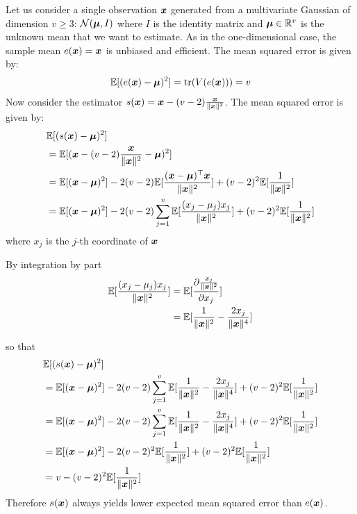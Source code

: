 \begin{example}
  \label{ex:stein}
  Let us consider a single observation $\xb$ generated from a multivariate Gaussian
  of dimension $v \geq 3$: $\Ncal(\mub, I)$ where $I$ is the identity matrix and
  $\mub \in \RR^v$ is the unknown mean that we want to estimate.
  As in the one-dimensional case, the sample mean $e(\xb) =\xb$ is unbiased and efficient.
  The mean squared error is given by:
  \begin{align}
    \EE[(e(\xb) -  \mub )^2] = \tr(V(e(\xb))) = v
  \end{align}
  Now consider the estimator $s(\xb) = \xb - (v-2) \frac{\xb}{\|\xb\|^2}$.
  The mean squared error is given by:
  \begin{align}
    &\EE[(s(\xb) - \mub)^2] \\ &= \EE[(\xb - (v-2) \frac{\xb}{\|\xb\|^2} - \mub)^2] \\
                        &= \EE[(\xb - \mub)^2] -2 (v-2)\EE[\frac{(\xb - \mub)^{\top}\xb}{\|\xb\|^2}] + (v-2)^2 \EE[\frac1{\| \xb \|^2}] \\
                            &= \EE[(\xb - \mub)^2] -2 (v-2) \sum_{j=1}^v \EE[\frac{(x_j - \mu_j)x_j}{\|\xb\|^2}] + (v-2)^2 \EE[\frac1{\| \xb \|^2}]
  \end{align}
  where $x_j$ is the $j$-th coordinate of $\xb$

  By integration by part 
  \begin{align}
    \EE[\frac{(x_j - \mu_j)x_j}{\|\xb\|^2}] &= \EE[\partialfrac{x_j}{\frac{x_j}{\|\xb\|^2}}]  \\
    &= \EE[\frac1{\|\xb\|^2} - \frac{2x_j}{\|\xb\|^4}]
  \end{align}

  so that 
  \begin{align}
    &\EE[(s(\xb) - \mub)^2] \\
    &= \EE[(\xb - \mub)^2] -2 (v-2) \sum_{j=1}^v \EE[\frac1{\|\xb\|^2} - \frac{2x_j}{\|\xb\|^4}] + (v-2)^2 \EE[\frac1{\| \xb \|^2}] \\
    &= \EE[(\xb - \mub)^2] -2 (v-2) \sum_{j=1}^v \EE[\frac1{\|\xb\|^2} - \frac{2x_j}{\|\xb\|^4}] + (v-2)^2 \EE[\frac1{\| \xb \|^2}] \\
    &= \EE[(\xb - \mub)^2] -2 (v-2)^2 \EE[\frac1{\|\xb\|^2}] + (v-2)^2 \EE[\frac1{\| \xb \|^2}] \\
    &= v - (v-2)^2 \EE[\frac1{\|\xb\|^2}]
 \end{align}
 Therefore $s(\xb)$ always yields lower expected mean squared error than
 $e(\xb)$.
\end{example}

